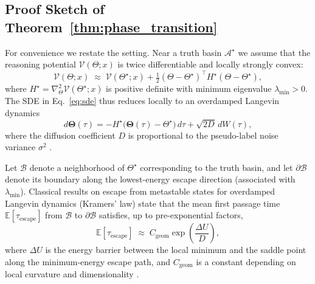 \documentclass{article}
\theoremstyle{plain}
\theoremstyle{definition}
\theoremstyle{remark}
\newcommand{\E}{\mathbb{E}}
\newcommand{\ThetaState}{\mathbf{\Theta}}  %
\newcommand{\Lyap}{\mathcal{V}}            %
\newcommand{\Attractor}{\mathcal{A}}       %
\newcommand{\Time}{\tau}                   %
\begin{document}
\subsection{Proof Sketch of Theorem~\ref{thm:phase_transition}}

For convenience we restate the setting. Near a truth basin $\Attractor^\star$ we assume that the reasoning potential $\Lyap(\Theta;x)$ is twice differentiable and locally strongly convex:
\[
\Lyap(\Theta;x)
\;\approx\;
\Lyap(\Theta^\star;x)
+\tfrac{1}{2}(\Theta-\Theta^\star)^\top H^\star (\Theta-\Theta^\star),
\]
where $H^\star = \nabla_{\Theta}^2 \Lyap(\Theta^\star;x)$ is positive definite with minimum eigenvalue $\lambda_{\min}>0$. The SDE in Eq.~\eqref{eq:sde} thus reduces locally to an overdamped Langevin dynamics
\begin{equation}
    d\ThetaState(\Time)
    =
    - H^\star \big(\ThetaState(\Time)-\Theta^\star\big)\, d\Time
    +
    \sqrt{2D}\, dW(\Time),
    \label{eq:app-langevin}
\end{equation}
where the diffusion coefficient $D$ is proportional to the pseudo-label noise variance $\sigma^2$ \cite{oksendal2003stochastic,welling2011bayesian,chen2024understanding,kumar2024consistency}.

Let $\mathcal{B}$ denote a neighborhood of $\Theta^\star$ corresponding to the truth basin, and let $\partial\mathcal{B}$ denote its boundary along the lowest-energy escape direction (associated with $\lambda_{\min}$). Classical results on escape from metastable states for overdamped Langevin dynamics (Kramers' law) state that the mean first passage time $\E[\tau_{\mathrm{escape}}]$ from $\mathcal{B}$ to $\partial\mathcal{B}$ satisfies, up to pre-exponential factors,
\begin{equation}
    \E[\tau_{\mathrm{escape}}]
    \;\approx\;
    C_{\mathrm{geom}}
    \exp\!\left(\frac{\Delta U}{D}\right),
    \label{eq:app-kramers}
\end{equation}
where $\Delta U$ is the energy barrier between the local minimum and the saddle point along the minimum-energy escape path, and $C_{\mathrm{geom}}$ is a constant depending on local curvature and dimensionality \cite{strogatz2018,bahri2024statmech,oksendal2003stochastic}.
\end{document}

